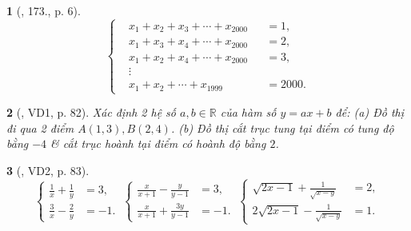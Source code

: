 \documentclass{article}
\newtheorem{baitoan}{}
\begin{document}
\begin{baitoan}[\cite{Dong_23_1001_toan_I}, 173., p. 6]
	\begin{equation*}
		\left\{\begin{split}
			&x_1 + x_2 + x_3 + \cdots + x_{2000} &&= 1,\\
			&x_1 + x_3 + x_4 + \cdots + x_{2000} &&= 2,\\
			&x_1 + x_2 + x_4 + \cdots + x_{2000} &&= 3,\\
			&\vdots\\
			&x_1 + x_2 + \cdots + x_{1999} &&= 2000.
		\end{split}\right.
	\end{equation*}
\end{baitoan}

\begin{baitoan}[\cite{Kien_dai_so_9}, VD1, p. 82]
	Xác định 2 hệ số $a,b\in\mathbb{R}$ của hàm số $y = ax + b$ để: (a) Đồ thị đi qua 2 điểm $A(1,3),B(2,4)$. (b) Đồ thị cắt trục tung tại điểm có tung độ bằng $-4$ \& cắt trục hoành tại điểm có hoành độ bằng $2$.
\end{baitoan}

\begin{baitoan}[\cite{Kien_dai_so_9}, VD2, p. 83]
	\begin{equation*}
		\left\{\begin{split}
			\frac{1}{x} + \frac{1}{y} &= 3,\\
			\frac{3}{x} - \frac{2}{y} &= -1.
		\end{split}\right.\ \left\{\begin{split}
			\frac{x}{x + 1} - \frac{y}{y - 1} &= 3,\\
			\frac{x}{x + 1} + \frac{3y}{y - 1} &= -1.
		\end{split}\right.\ \left\{\begin{split}
			\sqrt{2x - 1} + \frac{1}{\sqrt{x - y}} &= 2,\\
			2\sqrt{2x - 1} - \frac{1}{\sqrt{x - y}} &= 1.
		\end{split}\right.
	\end{equation*}
\end{baitoan}
\end{document}
